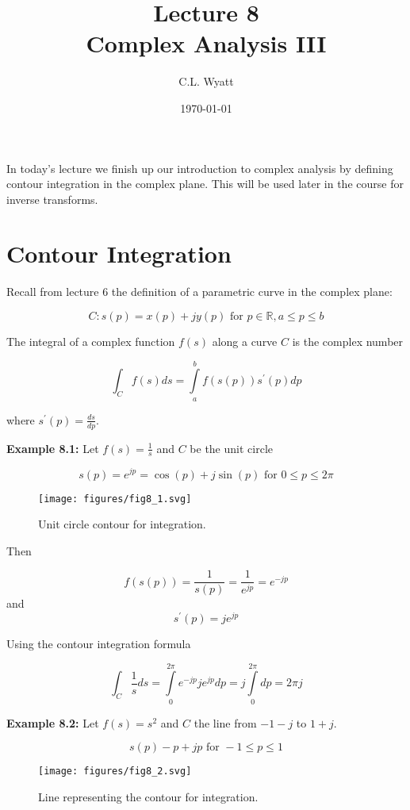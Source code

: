 \documentclass{article}
\begin{document}
\title{Lecture 8\\ Complex Analysis III}
\author{C.L. Wyatt}
\date{\today}
\maketitle

In today's lecture we finish up our introduction to complex analysis by defining contour integration in the complex plane. This will be used later in the course for inverse transforms.

\section{Contour Integration}

Recall from lecture 6 the definition of a parametric curve in the complex plane:

\[
C: s(p) = x(p) +jy(p) \text{ for } p\in\mathbb{R}, a \leq p \leq b
\]

The integral of a complex function $f(s)$ along a curve $C$ is the complex number

\[
\int_{C} f(s) ds = \int\limits_{a}^{b} f(s(p)) s^\prime(p) dp
\]

where $s^\prime(p) = \frac{ds}{dp}$.

\textbf{Example 8.1:} Let $f(s) = \frac{1}{s}$ and $C$ be the unit circle

\[
s(p) = e^{jp} = \cos(p) + j\sin(p) \text{ for } 0 \leq p \leq 2\pi
\]

\begin{figure}
  \centering
  \texttt{[image: figures/fig8\_1.svg]}
  \caption{Unit circle contour for integration.}
\end{figure}

Then

\[
f\left(s(p)\right) = \frac{1}{s(p)} = \frac{1}{e^{jp}} = e^{-jp}
\]
and
\[
s^\prime(p) = je^{jp}
\]

Using the contour integration formula

\[
\int_C \frac{1}{s} ds = \int\limits_0^{2\pi} e^{-jp} j e^{jp} dp = j \int\limits_0^{2\pi} dp = 2\pi j 
\]

\textbf{Example 8.2:} Let $f(s) = s^2$ and $C$ the line from $-1-j$ to $1 + j$.

\[
s(p) - p + jp \text{ for } -1 \leq p \leq 1
\]

\begin{figure}
  \centering
  \texttt{[image: figures/fig8\_2.svg]}
  \caption{Line representing the contour for integration.}
\end{figure}
\end{document}
